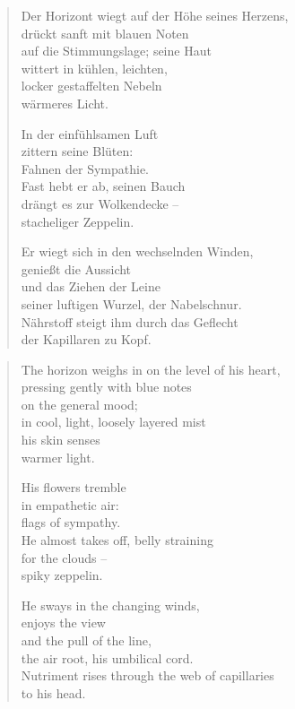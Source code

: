 
\cleartoverso


\begin{verse}
Der Horizont wiegt auf der Höhe seines Herzens,\\
drückt sanft mit blauen Noten\\
auf die Stimmungslage; seine Haut\\
wittert in kühlen, leichten,\\
locker gestaffelten Nebeln\\
wärmeres Licht.

In der einfühlsamen Luft\\
zittern seine Blüten:\\
Fahnen der Sympathie.\\
Fast hebt er ab, seinen Bauch\\
drängt es zur Wolkendecke --\\
stacheliger Zeppelin.

Er wiegt sich in den wechselnden Winden,\\
genießt die Aussicht\\
und das Ziehen der Leine\\
seiner luftigen Wurzel, der Nabelschnur.\\
Nährstoff steigt ihm durch das Geflecht\\
der Kapillaren zu Kopf.
\end{verse}

\clearpage


\begin{verse}
The horizon weighs in on the level of his heart,\\
pressing gently with blue notes\\
on the general mood;\\
in cool, light, loosely layered mist\\
his skin senses\\
warmer light.

His flowers tremble\\
in empathetic air:\\
flags of sympathy.\\
He almost takes off, belly straining\\
for the clouds --\\
spiky zeppelin.

He sways in the changing winds,\\
enjoys the view\\
and the pull of the line,\\
the air root, his umbilical cord.\\
Nutriment rises through the web of capillaries\\
to his head.
\end{verse}

